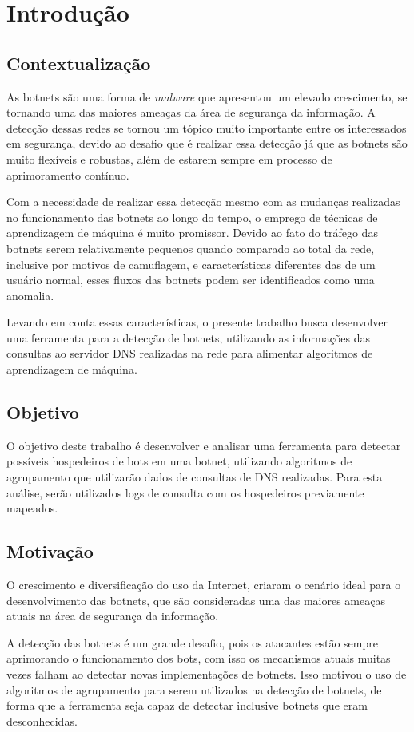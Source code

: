 \chapter{Introdução}
\section{Contextualização}
As botnets são uma forma de \textit{malware} que apresentou um elevado crescimento, se tornando uma das maiores ameaças da área de segurança da informação. A detecção dessas redes se tornou um tópico muito importante entre os interessados em segurança, devido ao desafio que é realizar essa detecção já que as botnets são muito flexíveis e robustas, além de estarem sempre em processo de aprimoramento contínuo.

Com a necessidade de realizar essa detecção mesmo com as mudanças realizadas no funcionamento das botnets ao longo do tempo, o emprego de técnicas de aprendizagem de máquina é muito promissor. Devido ao fato do tráfego das botnets serem relativamente pequenos quando comparado ao total da rede, inclusive por motivos de camuflagem, e características diferentes das de um usuário normal, esses fluxos das botnets podem ser identificados como uma anomalia. 

Levando em conta essas características, o presente trabalho busca desenvolver uma ferramenta para a detecção de botnets, utilizando as informações das consultas ao servidor DNS realizadas na rede para alimentar algoritmos de aprendizagem de máquina.

\section{Objetivo}
O objetivo deste trabalho é desenvolver e analisar uma ferramenta para detectar possíveis hospedeiros de bots em uma botnet, utilizando algoritmos de agrupamento que utilizarão dados de consultas de DNS realizadas. Para esta análise, serão utilizados logs de consulta com os hospedeiros previamente mapeados.

\section{Motivação}
O crescimento e diversificação do uso da Internet, criaram o cenário ideal para o desenvolvimento das botnets, que são consideradas uma das maiores ameaças atuais na área de segurança da informação.

A detecção das botnets é um grande desafio, pois os atacantes estão sempre aprimorando o funcionamento dos bots, com isso os mecanismos atuais muitas vezes falham ao detectar novas implementações de botnets. Isso motivou o uso de algoritmos de agrupamento para serem utilizados na detecção de botnets, de forma que a ferramenta seja capaz de detectar inclusive botnets que eram desconhecidas. 

